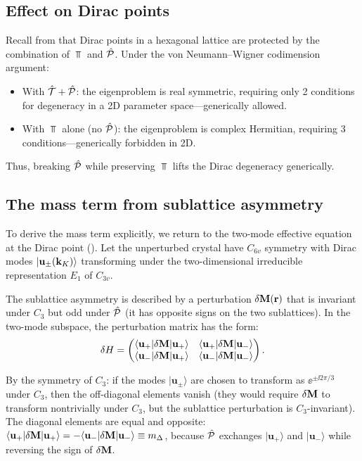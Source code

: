 \subsection{Effect on Dirac points}
\label{sec:ch12-effect-dirac}

Recall from  that Dirac points in a
hexagonal lattice are protected by the combination of $\Top$ and $\hat{\mathcal{P}}$.
Under the von Neumann--Wigner codimension argument:
\begin{itemize}
  \item With $\hat{\mathcal{T}}+\hat{\mathcal{P}}$: the eigenproblem is real symmetric, requiring
  only 2 conditions for degeneracy in a 2D parameter space---generically
  allowed.
  \item With $\Top$ alone (no $\hat{\mathcal{P}}$): the eigenproblem is complex
  Hermitian, requiring 3 conditions---generically forbidden in 2D.
\end{itemize}
Thus, breaking $\hat{\mathcal{P}}$ while preserving $\Top$ lifts the Dirac
degeneracy generically.

\subsection{The mass term from sublattice asymmetry}
\label{sec:ch12-mass-derivation}

To derive the mass term explicitly, we return to the two-mode effective
equation at the Dirac point ().  Let the
unperturbed crystal have $C_{6v}$ symmetry with Dirac modes
$|\mathbf{u}_\pm(\mathbf{k}_K)\rangle$ transforming under the
two-dimensional irreducible representation $E_1$ of $C_{3v}$.

The sublattice asymmetry is described by a perturbation
$\delta\mathbf{M}(\mathbf{r})$ that is invariant under $C_3$ but odd under $\hat{\mathcal{P}}$
(it has opposite signs on the two sublattices).  In the two-mode
subspace, the perturbation matrix has the form:
\begin{equation}\label{eq:ch12-perturbation-matrix}
  \delta H = \begin{pmatrix}
    \langle\mathbf{u}_+|\delta\mathbf{M}|\mathbf{u}_+\rangle &
    \langle\mathbf{u}_+|\delta\mathbf{M}|\mathbf{u}_-\rangle \\
    \langle\mathbf{u}_-|\delta\mathbf{M}|\mathbf{u}_+\rangle &
    \langle\mathbf{u}_-|\delta\mathbf{M}|\mathbf{u}_-\rangle
  \end{pmatrix}.
\end{equation}

By the symmetry of $C_3$: if the modes $|\mathbf{u}_\pm\rangle$ are
chosen to transform as $\ee^{\pm\ii 2\pi/3}$ under $C_3$, then the
off-diagonal elements vanish (they would require $\delta\mathbf{M}$ to
transform nontrivially under $C_3$, but the sublattice perturbation is
$C_3$-invariant).  The diagonal elements are equal and opposite:
$\langle\mathbf{u}_+|\delta\mathbf{M}|\mathbf{u}_+\rangle
=-\langle\mathbf{u}_-|\delta\mathbf{M}|\mathbf{u}_-\rangle\equiv m_\Delta$,
because $\hat{\mathcal{P}}$ exchanges $|\mathbf{u}_+\rangle$ and
$|\mathbf{u}_-\rangle$ while reversing the sign of $\delta\mathbf{M}$.

